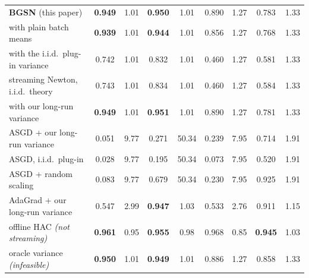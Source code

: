 \begin{table}[tbp]
{\begin{tabular}{lcccccccc}
\midrule
\textbf{BGSN} (this paper) & \textbf{0.949} & 1.01 & \textbf{0.950} & 1.01 & 0.890 & 1.27 & 0.783 & 1.33 \\
\quad with plain batch means & \textbf{0.939} & 1.01 & \textbf{0.944} & 1.01 & 0.856 & 1.27 & 0.768 & 1.33 \\
\quad with the i.i.d.\ plug-in variance & 0.742 & 1.01 & 0.832 & 1.01 & 0.460 & 1.27 & 0.581 & 1.33 \\
\addlinespace[2pt]
streaming Newton, i.i.d.\ theory & 0.743 & 1.01 & 0.834 & 1.01 & 0.460 & 1.27 & 0.584 & 1.33 \\
\quad with our long-run variance & \textbf{0.949} & 1.01 & \textbf{0.951} & 1.01 & 0.890 & 1.27 & 0.781 & 1.33 \\
\addlinespace[2pt]
ASGD + our long-run variance & 0.051 & 9.77 & 0.271 & 50.34 & 0.239 & 7.95 & 0.714 & 1.91 \\
ASGD, i.i.d.\ plug-in & 0.028 & 9.77 & 0.195 & 50.34 & 0.073 & 7.95 & 0.520 & 1.91 \\
ASGD + random scaling & 0.083 & 9.77 & 0.679 & 50.34 & 0.230 & 7.95 & 0.925 & 1.91 \\
AdaGrad + our long-run variance & 0.547 & 2.99 & \textbf{0.947} & 1.03 & 0.533 & 2.76 & 0.911 & 1.15 \\
\addlinespace[2pt]
offline HAC \emph{(not streaming)} & \textbf{0.961} & 0.95 & \textbf{0.955} & 0.98 & 0.968 & 0.85 & \textbf{0.945} & 1.03 \\
oracle variance \emph{(infeasible)} & \textbf{0.950} & 1.01 & \textbf{0.949} & 1.01 & 0.886 & 1.27 & 0.858 & 1.33 \\
\bottomrule
\end{tabular}
}
\end{table}
